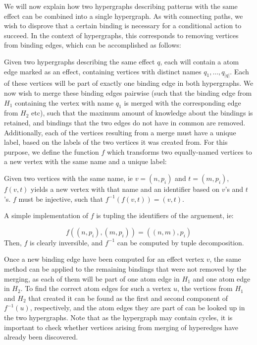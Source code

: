 \documentclass[../Master.tex]{subfiles}
\begin{document}
We will now explain how two hypergraphs describing patterns with the same effect can be combined into a single hypergraph. As with connecting paths, we wish to disprove that a certain binding is necessary for a conditional action to succeed. In the context of hypergraphs, this corresponds to removing vertices from binding edges, which can be accomplished as follows:

Given two hypergraphs describing the same effect $q$, each will contain a atom edge marked as an effect, containing vertices with distinct names $q_1, \ldots, q_{|q|}$. Each of these vertices will be part of exactly one binding edge in both hypergraphs. We now wish to merge these binding edges pairwise (such that the binding edge from $H_1$ containing the vertex with name $q_1$ is merged with the corresponding edge from $H_2$ etc), such that the maximum amount of knowledge about the bindings is retained, and bindings that the two edges do not have in common are removed. Additionally, each of the vertices resulting from a merge must have a unique label, based on the labels of the two vertices it was created from. For this purpose, we define the function $f$ which transforms two equally-named vertices to a new vertex with the same name and a unique label:

\begin{definition}
    Given two vertices with the same name, ie $v = \left(n, p_i \right)$ and $t = \left( m, p_i \right)$, $f(v,t)$ yields a new vertex with that name and an identifier based on $v$'s and $t$'s. $f$ must be injective, such that $f^{-1}(f(v,t)) = (v,t)$.
\end{definition}

A simple implementation of $f$ is tupling the identifiers of the arguement, ie:

\begin{equation*}
   f\left( \left(n, p_i \right), \left(m, p_i \right) \right) =
       \left( (n,m), p_i \right)
\end{equation*}
Then, $f$ is clearly inversible, and $f^{-1}$ can be computed by tuple decomposition.

Once a new binding edge have been computed for an effect vertex $v$, the same method can be applied to the remaining bindings that were not removed by the merging, as each of them will be part of one atom edge in $H_1$ and one atom edge in $H_2$. To find the correct atom edges for such a vertex $u$, the vertices from $H_1$ and $H_2$ that created it can be found as the first and second component of $f^{-1}(u)$, respectively, and the atom edges they are part of can be looked up in the two hypergraphs. Note that as the hypergraph may contain cycles, it is important to check whether vertices arising from merging of hyperedges have already been discovered.
\end{document}

